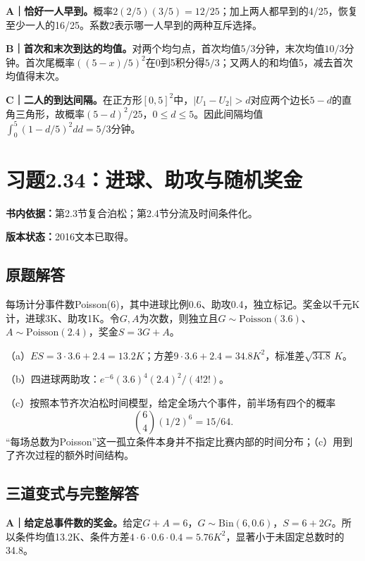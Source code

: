 \documentclass[
  11pt,
  a4paper,
  UTF8,fontset=fandol]{ctexart}
\let\OldSection\section
\renewcommand{\section}{\Needspace{7\baselineskip}\OldSection}
\let\OldSubsection\subsection
\renewcommand{\subsection}{\Needspace{5\baselineskip}\OldSubsection}
\begin{document}
\textbf{A｜恰好一人早到。}概率\(2(2/5)(3/5)=12/25\)；加上两人都早到的4/25，恢复至少一人的16/25。系数2表示哪一人早到的两种互斥选择。

\textbf{B｜首次和末次到达的均值。}对两个均匀点，首次均值\(5/3\)分钟，末次均值\(10/3\)分钟。首次尾概率\(((5-x)/5)^2\)在0到5积分得\(5/3\)；又两人的和均值5，减去首次均值得末次。

\textbf{C｜二人的到达间隔。}在正方形\([0,5]^2\)中，\(|U_1-U_2|>d\)对应两个边长\(5-d\)的直角三角形，故概率\((5-d)^2/25\)，\(0\le d\le5\)。因此间隔均值\(\int_0^5(1-d/5)^2dd=5/3\)分钟。

\newpage

\section{习题2.34：进球、助攻与随机奖金}\label{ux4e60ux98982.34ux8fdbux7403ux52a9ux653bux4e0eux968fux673aux5956ux91d1}

\textbf{书内依据：}第2.3节复合泊松；第2.4节分流及时间条件化。

\textbf{版本状态：}2016文本已取得。

\subsection{原题解答}\label{ux539fux9898ux89e3ux7b54-33}

每场计分事件数Poisson(6)，其中进球比例0.6、助攻0.4，独立标记。奖金以千元K计，进球3K、助攻1K。令\(G,A\)为次数，则独立且\(G\sim\mathrm{Poisson}(3.6)\)、\(A\sim\mathrm{Poisson}(2.4)\)，奖金\(S=3G+A\)。

（a）\(ES=3\cdot3.6+2.4=\boxed{13.2K}\)；方差\(9\cdot3.6+2.4=34.8K^2\)，标准差\(\boxed{\sqrt{34.8}\,K}\)。

（b）四进球两助攻：\(\boxed{e^{-6}(3.6)^4(2.4)^2/(4!2!)}\)。

（c）按照本节齐次泊松时间模型，给定全场六个事件，前半场有四个的概率
\[\boxed{\binom64(1/2)^6=15/64}.\]
``每场总数为Poisson''这一孤立条件本身并不指定比赛内部的时间分布；（c）用到了齐次过程的额外时间结构。

\subsection{三道变式与完整解答}\label{ux4e09ux9053ux53d8ux5f0fux4e0eux5b8cux6574ux89e3ux7b54-33}

\textbf{A｜给定总事件数的奖金。}给定\(G+A=6\)，\(G\sim\mathrm{Bin}(6,0.6)\)，\(S=6+2G\)。所以条件均值13.2K、条件方差\(4\cdot6\cdot0.6\cdot0.4=5.76K^2\)，显著小于未固定总数时的34.8。
\end{document}
